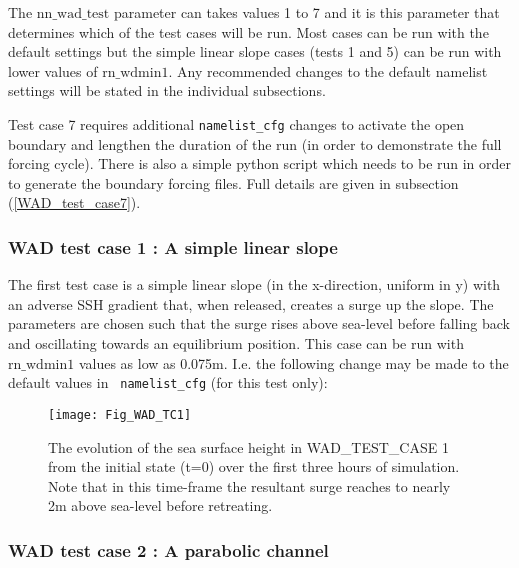 
The $\mathrm{nn\_wad\_test}$ parameter can takes values 1 to 7 and it is this parameter
that determines which of the test cases will be run. Most cases can be run with the
default settings but the simple linear slope cases (tests 1 and 5) can be run with lower
values of $\mathrm{rn\_wdmin1}$. Any recommended changes to the default namelist settings
will be stated in the individual subsections.

Test case 7 requires additional {\tt namelist\_cfg} changes to activate the open boundary
and lengthen the duration of the run (in order to demonstrate the full forcing cycle).
There is also a simple python script which needs to be run in order to generate the
boundary forcing files.  Full details are given in subsection (\ref{WAD_test_case7}).

\clearpage
\subsubsection [WAD test case 1 : A simple linear slope]
                    {WAD test case 1 : A simple linear slope}
\label{WAD_test_case1}

The first test case is a simple linear slope (in the x-direction, uniform in y) with an
adverse SSH gradient that, when released, creates a surge up the slope. The parameters are
chosen such that the surge rises above sea-level before falling back and oscillating
towards an equilibrium position. This case can be run with $\mathrm{rn\_wdmin1}$ values as
low as 0.075m. I.e. the following change may be made to the default values in {\tt
namelist\_cfg} (for this test only):


\begin{figure}[htb] \begin{center}
\texttt{[image: Fig\_WAD\_TC1]}
\caption{ \label{Fig_WAD_TC1}
The evolution of the sea surface height in WAD\_TEST\_CASE 1 from the initial state (t=0)
over the first three hours of simulation. Note that in this time-frame the resultant surge
reaches to nearly 2m above sea-level before retreating.}
\end{center}\end{figure}

\clearpage
\subsubsection [WAD test case 2 : A parabolic channel ]
                    {WAD test case 2 : A parabolic channel}
\label{WAD_test_case2}

